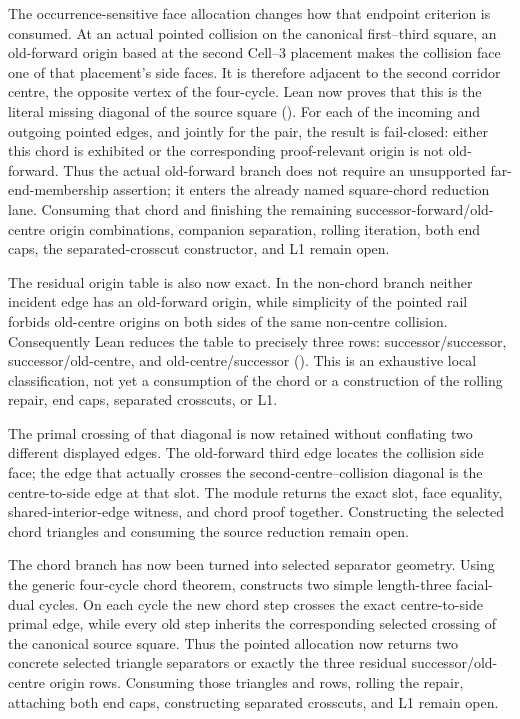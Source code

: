 \documentclass[11pt]{article}
\theoremstyle{definition}
\begin{document}
The occurrence-sensitive face allocation changes how that endpoint criterion
is consumed.  At an actual pointed collision on the canonical first--third
square, an old-forward origin based at the second Cell--3 placement makes the
collision face one of that placement's side faces.  It is therefore adjacent
to the second corridor centre, the opposite vertex of the four-cycle.  Lean
now proves that this is the literal missing diagonal of the source square
().
For each of the incoming and outgoing pointed edges, and jointly for the pair,
the result is fail-closed: either this chord is exhibited or the corresponding
proof-relevant origin is not old-forward.  Thus the actual old-forward branch
does not require an unsupported far-end-membership assertion; it enters the
already named square-chord reduction lane.  Consuming that chord and finishing
the remaining successor-forward/old-centre origin combinations, companion
separation, rolling iteration, both end caps, the separated-crosscut
constructor, and L1 remain open.

The residual origin table is also now exact.  In the non-chord branch neither
incident edge has an old-forward origin, while simplicity of the pointed rail
forbids old-centre origins on both sides of the same non-centre collision.
Consequently Lean reduces the table to precisely three rows:
successor/successor, successor/old-centre, and
old-centre/successor
().
This is an exhaustive local classification, not yet a consumption of the
chord or a construction of the rolling repair, end caps, separated
crosscuts, or L1.

The primal crossing of that diagonal is now retained without conflating two
different displayed edges.  The old-forward third edge locates the collision
side face; the edge that actually crosses the second-centre--collision
diagonal is the centre-to-side edge at that slot.  The module
returns the exact slot, face equality, shared-interior-edge witness, and chord
proof together.  Constructing the selected chord triangles and consuming the
source reduction remain open.

The chord branch has now been turned into selected separator geometry.
Using the generic four-cycle chord theorem,
constructs two simple length-three facial-dual cycles.  On each cycle the new
chord step crosses the exact centre-to-side primal edge, while every old step
inherits the corresponding selected crossing of the canonical source square.
Thus the pointed allocation now returns two concrete selected triangle
separators or exactly the three residual successor/old-centre origin rows.
Consuming those triangles and rows, rolling the repair, attaching both end
caps, constructing separated crosscuts, and L1 remain open.
\end{document}
